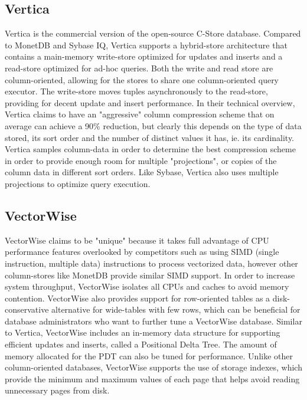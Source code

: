 \documentclass[11pt,a4paper]{report}
\begin{document}
\subsection{Vertica}
Vertica is the commercial version of the open-source C-Store database.\cite{cstorews} Compared to MonetDB and Sybase IQ, Vertica supports a hybrid-store architecture that contains a main-memory write-store optimized for updates and inserts and a read-store optimized for ad-hoc queries. \cite{stonebraker2005c, verticawp} Both the write and read store are column-oriented, allowing for the stores to share one column-oriented query executor. The write-store moves tuples asynchronously to the read-store, providing for decent update and insert performance.\cite{vldbtut} In their technical overview, Vertica claims to have an "aggressive" column compression scheme that on average can achieve a 90\% reduction, but clearly this depends on the type of data stored, its sort order and the number of distinct values it has, ie. its cardinality.\cite{verticawp} Vertica samples column-data in order to determine the best compression scheme in order to provide enough room for multiple "projections", or copies of the column data in different sort orders.\cite{verticawp} Like Sybase, Vertica also uses multiple projections to optimize query execution. \cite{macnicol2004sybase}

\subsection{VectorWise}
VectorWise claims to be "unique" because it takes full advantage of CPU performance features overlooked by competitors such as using SIMD (single instruction, multiple data) instructions to process vectorized data, however other column-stores like MonetDB provide similar SIMD support. \cite{vwwp} \cite{vldbtut} In order to increase system throughput, VectorWise isolates all CPUs and caches to avoid memory contention. \cite{vwwp} VectorWise also provides support for row-oriented tables as a disk-conservative alternative for wide-tables with few rows, which can be beneficial for database administrators who want to further tune a VectorWise database.\cite{vwwp} Similar to Vertica, VectorWise includes an in-memory data structure for supporting efficient updates and inserts, called a Positional Delta Tree.\cite{vwwp} The amount of memory allocated for the PDT can also be tuned for performance. Unlike other column-oriented databases, VectorWise supports the use of storage indexes, which provide the minimum and maximum values of each page that helps avoid reading unnecessary pages from disk.\cite{vwwp}
\end{document}
